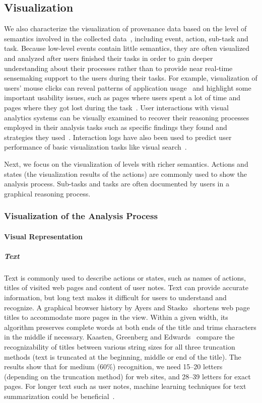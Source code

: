 \subsection{Visualization}
We also characterize the visualization of provenance data based on the level of semantics involved in the collected data~\cite{Gotz2009}, including event, action, sub-task and task. Because low-level events contain little semantics, they are often visualized and analyzed after users finished their tasks in order to gain deeper understanding about their processes rather than to provide near real-time sensemaking support to the users during their tasks. For example, visualization of users' mouse clicks can reveal patterns of application usage~\cite{Matejka2013} and highlight some important usability issues, such as pages where users spent a lot of time and pages where they got lost during the task~\cite{Waterson2002}. User interactions with visual analytics systems can be visually examined to recover their reasoning processes employed in their analysis tasks such as specific findings they found and strategies they used~\cite{Dou2009, Guo2016}. Interaction logs have also been used to predict user performance of basic visualization tasks like visual search~\cite{Brown2014}.

Next, we focus on the visualization of levels with richer semantics. Actions and states
(the visualization results of the actions) are commonly used to show the analysis process. Sub-tasks and tasks are often documented by users in a graphical reasoning process.

\subsubsection{Visualization of the Analysis Process}

\paragraph{Visual Representation}

\subparagraph{Text}
Text is commonly used to describe actions or states, such as names of actions, titles of visited web pages and content of user notes. Text can provide accurate information, but long text makes it difficult for users to understand and recognize. A graphical browser history by Ayers and Stasko~\cite{Ayers1995} shortens web page titles to accommodate more pages in the view. Within a given width, its algorithm preserves complete words at both ends of the title and trims characters in the middle if necessary. Kaasten, Greenberg and Edwards~\cite{Kaasten2001} compare the recognizability of titles between various string sizes for all three truncation methods (text is truncated at the beginning, middle or end of the title). The results show that for medium (60\%) recognition, we need 15--20 letters (depending on
the truncation method) for web sites, and 28--39 letters for
exact pages. For longer text such as user notes, machine learning techniques for text summarization could be beneficial~\cite{Nenkova2012}.


